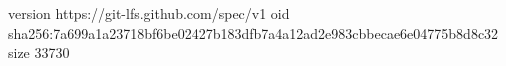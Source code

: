 version https://git-lfs.github.com/spec/v1
oid sha256:7a699a1a23718bf6be02427b183dfb7a4a12ad2e983cbbecae6e04775b8d8c32
size 33730
